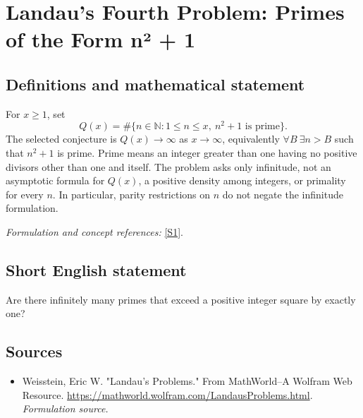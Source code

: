 \documentclass[11pt]{article}
\begin{document}
\section*{\texorpdfstring{Landau's Fourth Problem: Primes of the Form n² + 1}{Landau's Fourth Problem: Primes of the Form n² + 1}}\label{47}
\subsection{Definitions and mathematical statement}
For $x\ge1$, set
\[
 Q(x)=\#\{n\in{\mathbb{N}}:1\le n\le x,\ n^2+1\text{ is prime}\}.
\]
The selected conjecture is $Q(x)\to\infty$ as $x\to\infty$, equivalently
$\forall B\ \exists n>B$ such that $n^2+1$ is prime. Prime means an integer greater than one having no positive divisors other than one and itself. The problem asks only infinitude, not an asymptotic formula for $Q(x)$, a positive density among integers, or primality for every $n$. In particular, parity restrictions on $n$ do not negate the infinitude formulation.
\par\smallskip\textit{Formulation and concept references:} \href{https://mathworld.wolfram.com/LandausProblems.html}{[S1]}.

\subsection{Short English statement}
Are there infinitely many primes that exceed a positive integer square by exactly one?
\subsection{Sources}
\begin{itemize}
\item[S1]Weisstein, Eric W. "Landau's Problems." From MathWorld--A Wolfram Web Resource.
\url{https://mathworld.wolfram.com/LandausProblems.html}.
\textit{Formulation source.}
\end{itemize}
\end{document}

